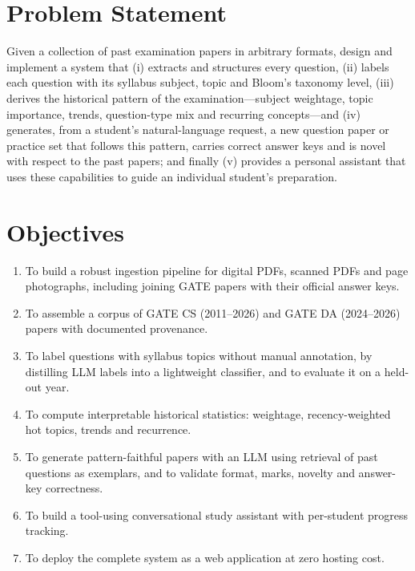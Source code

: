 \section{Problem Statement}
Given a collection of past examination papers in arbitrary formats, design and implement a system that (i) extracts and
structures every question, (ii) labels each question with its syllabus subject, topic and Bloom's taxonomy level,
(iii) derives the historical pattern of the examination---subject weightage, topic importance, trends, question-type
mix and recurring concepts---and (iv) generates, from a student's natural-language request, a new question paper or
practice set that follows this pattern, carries correct answer keys and is novel with respect to the past papers;
and finally (v) provides a personal assistant that uses these capabilities to guide an individual student's preparation.

\section{Objectives}
\begin{enumerate}
  \item To build a robust ingestion pipeline for digital PDFs, scanned PDFs and page photographs, including joining GATE
        papers with their official answer keys.
  \item To assemble a corpus of GATE CS (2011--2026) and GATE DA (2024--2026) papers with documented provenance.
  \item To label questions with syllabus topics without manual annotation, by distilling LLM labels into a lightweight
        classifier, and to evaluate it on a held-out year.
  \item To compute interpretable historical statistics: weightage, recency-weighted hot topics, trends and recurrence.
  \item To generate pattern-faithful papers with an LLM using retrieval of past questions as exemplars, and to validate
        format, marks, novelty and answer-key correctness.
  \item To build a tool-using conversational study assistant with per-student progress tracking.
  \item To deploy the complete system as a web application at zero hosting cost.
\end{enumerate}

